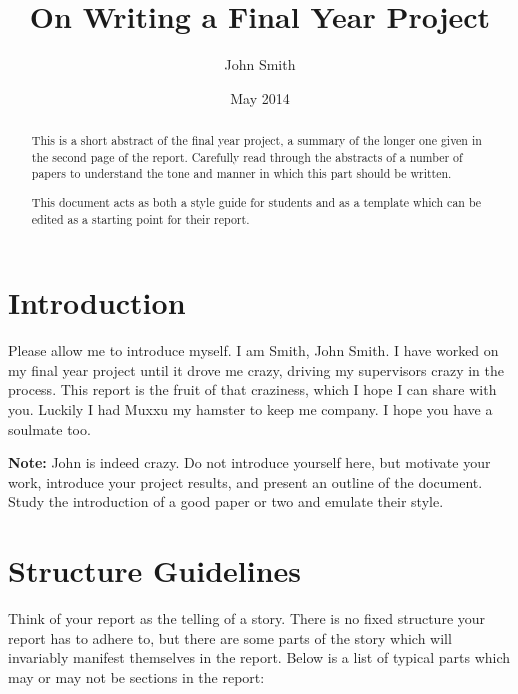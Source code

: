 \documentclass{csfyp}
\title{On Writing a Final Year Project}
\author{John Smith}
\date{May 2014}
\begin{document}
\tableofcontents

\maketitle

\setcounter{page}{1}


\begin{abstract}
This is a short abstract of the final year project, a summary of the longer one given in the second page of the report. Carefully read through the abstracts of a number of papers to understand the tone and manner in which this part should be written.

This document acts as both a style guide for students and as a template which can be edited as a starting point for their report.
\end{abstract}

\section{Introduction}
\label{s:intro}

Please allow me to introduce myself. I am Smith, John Smith. I have worked on my final year project until it drove me crazy, driving my supervisors crazy in the process. This report is the fruit of that craziness, which I hope I can share with you. Luckily I had Muxxu my hamster to keep me company. I hope you have a soulmate too.

\textbf{Note:} John is indeed crazy. Do not introduce yourself here, but motivate your work, introduce your project results, and present an outline of the document. Study the introduction of a good paper or two and emulate their style.

\section{Structure Guidelines}

Think of your report as the telling of a story. There is no fixed structure your report has to adhere to, but there are some parts of the story which will invariably manifest themselves in the report. Below is a list of typical parts which may or may not be sections in the report:
\end{document}

